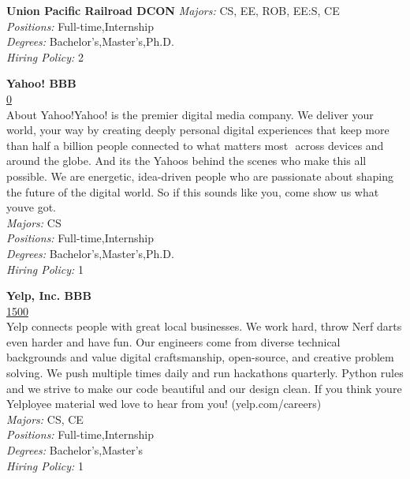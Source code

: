 \documentclass[twoside]{article}
\begin{document}
\begin{center}
\begin{multicols}{2}
\begin{minipage}{.95\columnwidth}{\Large\bf Union Pacific Railroad \hfill DCON}
    \emph{Majors:} CS, EE, ROB, EE:S, CE\\
    \emph{Positions:} Full-time,Internship\\
    \emph{Degrees:} Bachelor's,Master's,Ph.D.\\
    \emph{Hiring Policy:} 2\\
\end{minipage}
 \begin{minipage}{.95\columnwidth}{\Large\bf Yahoo! \hfill BBB}\\
    \url{0}\\
    About Yahoo!Yahoo! is the premier digital media company. We deliver your world, your way by creating deeply personal digital experiences that keep more than half a billion people connected to what matters most  across devices and around the globe. And its the Yahoos behind the scenes who make this all possible. We are energetic, idea-driven people who are passionate about shaping the future of the digital world. So if this sounds like you, come show us what youve got.\\
    \emph{Majors:} CS\\
    \emph{Positions:} Full-time,Internship\\
    \emph{Degrees:} Bachelor's,Master's,Ph.D.\\
    \emph{Hiring Policy:} 1\\
\end{minipage}
 \begin{minipage}{.95\columnwidth}{\Large\bf Yelp, Inc. \hfill BBB}\\
    \url{1500}\\
    Yelp connects people with great local businesses. We work hard, throw Nerf darts even harder and have fun. Our engineers come from diverse technical backgrounds and value digital craftsmanship, open-source, and creative problem solving. We push multiple times daily and run hackathons quarterly. Python rules and we strive to make our code beautiful and our design clean. If you think youre Yelployee material wed love to hear from you! (yelp.com/careers)\\
    \emph{Majors:} CS, CE\\
    \emph{Positions:} Full-time,Internship\\
    \emph{Degrees:} Bachelor's,Master's\\
    \emph{Hiring Policy:} 1\\
\end{minipage}
 \end{multicols}\end{center}
\end{document}
